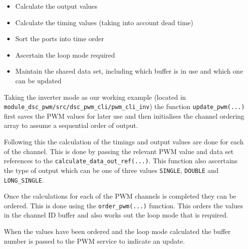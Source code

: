 \begin{itemize}
\item Calculate the output values
\item Calculate the timing values (taking into account dead time)
\item Sort the ports into time order
\item Ascertain the loop mode required
\item Maintain the shared data set, including which buffer is in use and which one can be updated
\end{itemize}

Taking the inverter mode as our working example (located in \newline \verb=module_dsc_pwm/src/dsc_pwm_cli/pwm_cli_inv=) the function \verb=update_pwm(...)= first saves the PWM values for later use and then initialises the channel ordering array to assume a sequential order of output. 

Following this the calculation of the timings and output values are done for each of the channel. This is done by passing the relevant PWM value and data set references to the \verb=calculate_data_out_ref(...)=. This function also ascertains the type of output which can be one of three values \verb=SINGLE=, \verb=DOUBLE= and \verb=LONG_SINGLE=.

Once the calculations for each of the PWM channels is completed they can be ordered. This is done using the \verb=order_pwm(...)= function. This orders the values in the channel ID buffer and also works out the loop mode that is required.

When the values have been ordered and the loop mode calculated the buffer number is passed to the PWM service to indicate an update.

